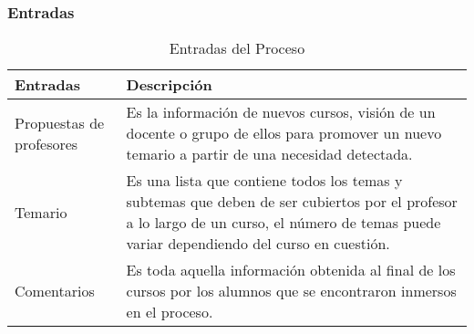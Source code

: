 \subsubsection{Entradas}							%

\begin{table}[H]
\centering
	\begin{tabular}{p{5cm} p{11cm}}
		\hline
			\textbf{Entradas} & \textbf{Descripción}\\
		\hline
		\hline
		Propuestas de profesores & Es la información de nuevos cursos, visión de un docente o grupo de ellos para promover un nuevo temario a partir de una necesidad detectada.\\
		\hline
		Temario & Es una lista que contiene todos los temas y subtemas que deben de ser cubiertos por el profesor a lo largo de un curso, el número de temas puede variar dependiendo del curso en cuestión.    \\	
		\hline
		Comentarios & Es toda aquella información obtenida al final de los cursos por los alumnos que se encontraron inmersos en el proceso.\\
	\end{tabular}
\caption{Entradas del Proceso}
\end{table}